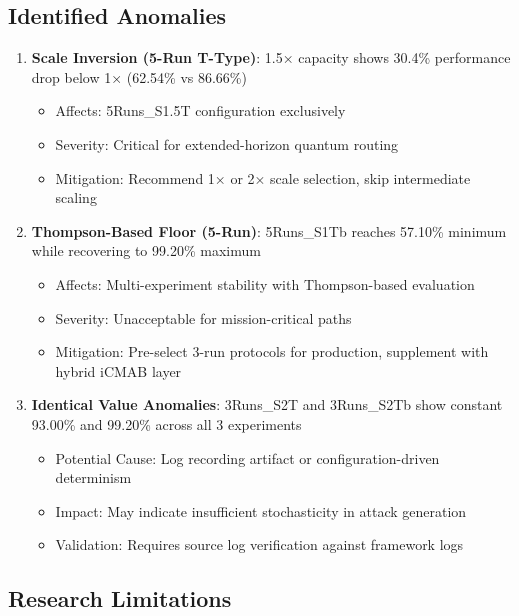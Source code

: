 \documentclass[12pt,a4paper]{article}
\newcommand{\warning}[1]{\textcolor{warningred}{\textbf{#1}}}
\begin{document}
\subsection{Identified Anomalies}

\begin{tcolorbox}[colback=warningred!10,colframe=warningred,title=\textbf{Configuration-Specific Issues}]

\begin{enumerate}
\item \warning{Scale Inversion (5-Run T-Type)}: 1.5× capacity shows 30.4\% performance drop below 1× (62.54\% vs 86.66\%)
\begin{itemize}
\item Affects: 5Runs\_S1.5T configuration exclusively
\item Severity: Critical for extended-horizon quantum routing
\item Mitigation: Recommend 1× or 2× scale selection, skip intermediate scaling
\end{itemize}

\item \warning{Thompson-Based Floor (5-Run)}: 5Runs\_S1Tb reaches 57.10\% minimum while recovering to 99.20\% maximum
\begin{itemize}
\item Affects: Multi-experiment stability with Thompson-based evaluation
\item Severity: Unacceptable for mission-critical paths
\item Mitigation: Pre-select 3-run protocols for production, supplement with hybrid iCMAB layer
\end{itemize}

\item \warning{Identical Value Anomalies}: 3Runs\_S2T and 3Runs\_S2Tb show constant 93.00\% and 99.20\% across all 3 experiments
\begin{itemize}
\item Potential Cause: Log recording artifact or configuration-driven determinism
\item Impact: May indicate insufficient stochasticity in attack generation
\item Validation: Requires source log verification against framework logs
\end{itemize}
\end{enumerate}

\end{tcolorbox}

\subsection{Research Limitations}
\end{document}
